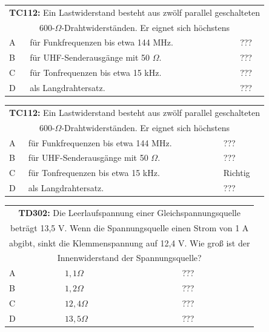 \begin{frame}
	\begin{small}	
	\begin{tabular}{|l|l|l|}
	\hline
		\multicolumn{3}{|c|}{\textbf{TC112:} Ein Lastwiderstand besteht aus zwölf parallel geschalteten }\\
		\multicolumn{3}{|c|}{600-$\Omega$-Drahtwiderständen. Er eignet sich höchstens}\\
		\hline
		A & für Funkfrequenzen bis etwa 144 MHz. & ??? \\ \hline
		B & für UHF-Senderausgänge mit 50 $\Omega$. & ??? \\ \hline
		C & für Tonfrequenzen bis etwa 15 kHz. & ??? \\ \hline
		D & als Langdrahtersatz.& ??? \\ \hline 		
	\end{tabular}
	\end{small}
\end{frame}
\begin{frame}
	\begin{small}	
	\begin{tabular}{|l|l|l|}
	\hline
		\multicolumn{3}{|c|}{\textbf{TC112:} Ein Lastwiderstand besteht aus zwölf parallel geschalteten }\\
		\multicolumn{3}{|c|}{600-$\Omega$-Drahtwiderständen. Er eignet sich höchstens}\\
		\hline
		A & für Funkfrequenzen bis etwa 144 MHz. & ??? \\ \hline
		B & für UHF-Senderausgänge mit 50 $\Omega$. & ??? \\ \hline
		C & für Tonfrequenzen bis etwa 15 kHz. & Richtig \\ \hline
		D & als Langdrahtersatz.& ??? \\ \hline 		
	\end{tabular}
	\end{small}
\end{frame}

\begin{frame}
	\begin{small}	
	\begin{tabular}{|l|l|l|}
	\hline
		\multicolumn{3}{|c|}{\textbf{TD302:} Die Leerlaufspannung einer Gleichspannungsquelle}\\
		\multicolumn{3}{|c|}{beträgt 13,5 V. Wenn die Spannungsquelle einen Strom von 1 A}\\
		\multicolumn{3}{|c|}{abgibt, sinkt die Klemmenspannung auf 12,4 V. Wie groß ist der}\\			\multicolumn{3}{|c|}{Innenwiderstand der Spannungsquelle?}\\
		\hline
		A & $1,1 \Omega$ & ??? \\ \hline
		B & $1,2 \Omega$ & ??? \\ \hline
		C & $12,4 \Omega$ & ??? \\ \hline
		D & $13,5 \Omega$ & ??? \\ \hline 		
	\end{tabular}
	\end{small}
\end{frame}

